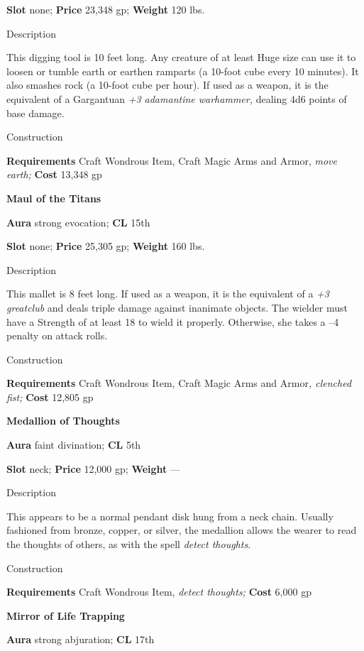 \textbf{Slot} none; \textbf{Price} 23,348 gp; \textbf{Weight} 120 lbs.
				
Description
				
This digging tool is 10 feet long. Any creature of at least Huge size can use it to loosen or tumble earth or earthen ramparts (a 10-foot cube every 10 minutes). It also smashes rock (a 10-foot cube per hour). If used as a weapon, it is the equivalent of a Gargantuan\textit{ +3 adamantine warhammer,} dealing 4d6 points of base damage. 
				
Construction
				
\textbf{Requirements} Craft Wondrous Item, Craft Magic Arms and Armor,\textit{ move earth; }\textbf{Cost }13,348 gp
				
\textbf{Maul of the Titans}
				
\textbf{Aura} strong evocation;\textbf{ CL }15th
				
\textbf{Slot} none; \textbf{Price} 25,305 gp; \textbf{Weight} 160 lbs.
				
Description
				
This mallet is 8 feet long. If used as a weapon, it is the equivalent of a \textit{+3 greatclub} and deals triple damage against inanimate objects. The wielder must have a Strength of at least 18 to wield it properly. Otherwise, she takes a --4 penalty on attack rolls. 
				
Construction
				
\textbf{Requirements} Craft Wondrous Item, Craft Magic Arms and Armor\textit{, clenched fist; }\textbf{Cost }12,805 gp
				
\textbf{Medallion of Thoughts}
				
\textbf{Aura} faint divination;\textbf{ CL }5th
				
\textbf{Slot} neck; \textbf{Price} 12,000 gp; \textbf{Weight }---
				
Description
				
This appears to be a normal pendant disk hung from a neck chain. Usually fashioned from bronze, copper, or silver, the medallion allows the wearer to read the thoughts of others, as with the spell \textit{detect thoughts}. 
				
Construction
				
\textbf{Requirements} Craft Wondrous Item,\textit{ detect thoughts;}\textbf{ Cost }6,000 gp
				
\textbf{Mirror of Life Trapping}
				
\textbf{Aura} strong abjuration;\textbf{ CL }17th
				
